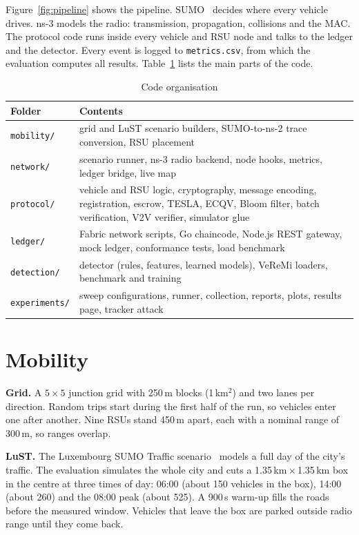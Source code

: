 Figure~\ref{fig:pipeline} shows the pipeline. SUMO~\cite{lopez2018sumo} decides where every vehicle drives. ns-3 models
the radio: transmission, propagation, collisions and the MAC. The protocol code runs inside every
vehicle and RSU node and talks to the ledger and the detector. Every event is logged to
\texttt{metrics.csv}, from which the evaluation computes all results. Table~\ref{tab:code} lists
the main parts of the code.

\begin{table}[htbp]\centering\small
\caption{Code organisation}\label{tab:code}
\begin{tabular}{@{}lp{10.5cm}@{}}
\toprule
Folder & Contents \\
\midrule
\texttt{mobility/} & grid and LuST scenario builders, SUMO-to-ns-2 trace conversion, RSU placement \\
\texttt{network/} & scenario runner, ns-3 radio backend, node hooks, metrics, ledger bridge, live map \\
\texttt{protocol/} & vehicle and RSU logic, cryptography, message encoding, registration, escrow, TESLA, ECQV, Bloom filter, batch verification, V2V verifier, simulator glue \\
\texttt{ledger/} & Fabric network scripts, Go chaincode, Node.js REST gateway, mock ledger, conformance tests, load benchmark \\
\texttt{detection/} & detector (rules, features, learned models), VeReMi loaders, benchmark and training \\
\texttt{experiments/} & sweep configurations, runner, collection, reports, plots, results page, tracker attack \\
\bottomrule
\end{tabular}
\end{table}

\section{Mobility}

\textbf{Grid.} A $5\times5$ junction grid with 250\,m blocks (1\,km$^2$) and two lanes per
direction. Random trips start during the first half of the run, so vehicles enter one after another.
Nine RSUs stand 450\,m apart, each with a nominal range of 300\,m, so ranges overlap.

\textbf{LuST.} The Luxembourg SUMO Traffic scenario~\cite{codeca2015lust} models a full day of the
city's traffic. The evaluation simulates the whole city and cuts a 1.35\,km\,$\times$\,1.35\,km box
in the centre at three times of day: 06:00 (about 150 vehicles in the box), 14:00 (about 260) and the
08:00 peak (about 525). A 900\,s warm-up fills the roads before the measured window. Vehicles that
leave the box are parked outside radio range until they come back.

